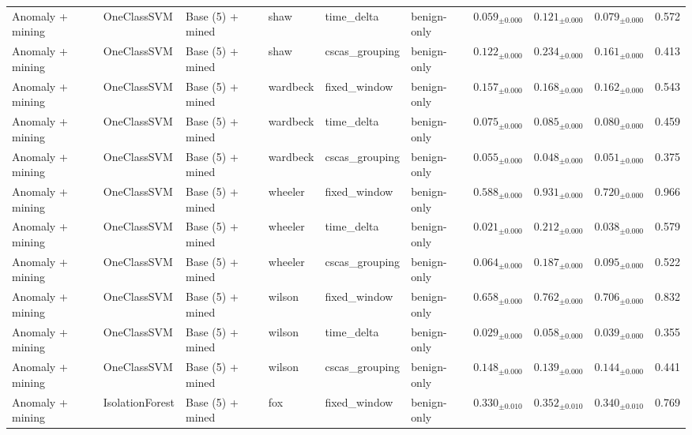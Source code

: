 \begin{longtable}{llllllcccc}
\addlinespace
Anomaly + mining & OneClassSVM & Base (5) + mined & shaw & time\_delta & benign-only & $0.059_{\pm 0.000}$ & $0.121_{\pm 0.000}$ & $0.079_{\pm 0.000}$ & 0.572 \\
\addlinespace
Anomaly + mining & OneClassSVM & Base (5) + mined & shaw & cscas\_grouping & benign-only & $0.122_{\pm 0.000}$ & $0.234_{\pm 0.000}$ & $0.161_{\pm 0.000}$ & 0.413 \\
\addlinespace
Anomaly + mining & OneClassSVM & Base (5) + mined & wardbeck & fixed\_window & benign-only & $0.157_{\pm 0.000}$ & $0.168_{\pm 0.000}$ & $0.162_{\pm 0.000}$ & 0.543 \\
\addlinespace
Anomaly + mining & OneClassSVM & Base (5) + mined & wardbeck & time\_delta & benign-only & $0.075_{\pm 0.000}$ & $0.085_{\pm 0.000}$ & $0.080_{\pm 0.000}$ & 0.459 \\
\addlinespace
Anomaly + mining & OneClassSVM & Base (5) + mined & wardbeck & cscas\_grouping & benign-only & $0.055_{\pm 0.000}$ & $0.048_{\pm 0.000}$ & $0.051_{\pm 0.000}$ & 0.375 \\
\addlinespace
Anomaly + mining & OneClassSVM & Base (5) + mined & wheeler & fixed\_window & benign-only & $0.588_{\pm 0.000}$ & $0.931_{\pm 0.000}$ & $0.720_{\pm 0.000}$ & 0.966 \\
\addlinespace
Anomaly + mining & OneClassSVM & Base (5) + mined & wheeler & time\_delta & benign-only & $0.021_{\pm 0.000}$ & $0.212_{\pm 0.000}$ & $0.038_{\pm 0.000}$ & 0.579 \\
\addlinespace
Anomaly + mining & OneClassSVM & Base (5) + mined & wheeler & cscas\_grouping & benign-only & $0.064_{\pm 0.000}$ & $0.187_{\pm 0.000}$ & $0.095_{\pm 0.000}$ & 0.522 \\
\addlinespace
Anomaly + mining & OneClassSVM & Base (5) + mined & wilson & fixed\_window & benign-only & $0.658_{\pm 0.000}$ & $0.762_{\pm 0.000}$ & $0.706_{\pm 0.000}$ & 0.832 \\
\addlinespace
Anomaly + mining & OneClassSVM & Base (5) + mined & wilson & time\_delta & benign-only & $0.029_{\pm 0.000}$ & $0.058_{\pm 0.000}$ & $0.039_{\pm 0.000}$ & 0.355 \\
\addlinespace
Anomaly + mining & OneClassSVM & Base (5) + mined & wilson & cscas\_grouping & benign-only & $0.148_{\pm 0.000}$ & $0.139_{\pm 0.000}$ & $0.144_{\pm 0.000}$ & 0.441 \\
\addlinespace
Anomaly + mining & IsolationForest & Base (5) + mined & fox & fixed\_window & benign-only & $0.330_{\pm 0.010}$ & $0.352_{\pm 0.010}$ & $0.340_{\pm 0.010}$ & 0.769 \\

\end{longtable}
